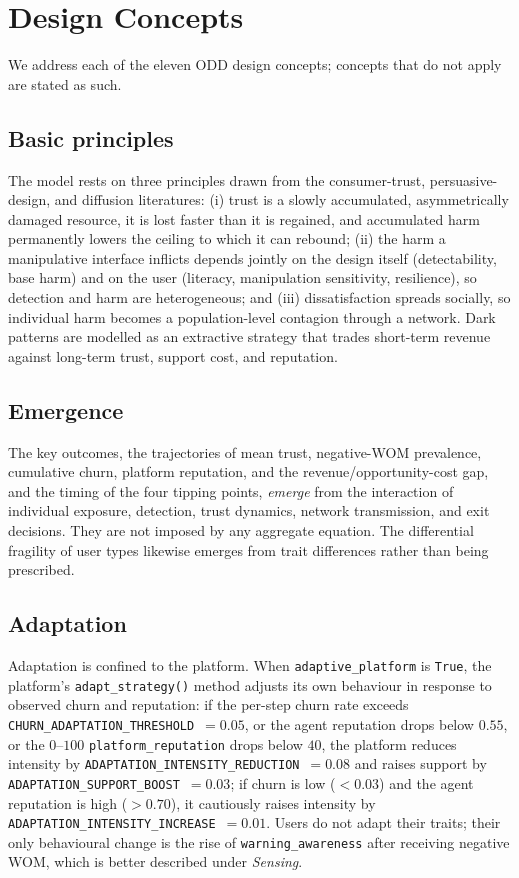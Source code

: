 \documentclass[11pt]{article}
\newcommand{\code}[1]{\texttt{#1}}
\begin{document}
\section{Design Concepts}
\label{sec:design}

We address each of the eleven ODD design concepts; concepts that do not apply are
stated as such.

\subsection{Basic principles}
The model rests on three principles drawn from the consumer-trust, persuasive-design,
and diffusion literatures: (i) trust is a slowly accumulated, asymmetrically
damaged resource, it is lost faster than it is regained, and accumulated harm
permanently lowers the ceiling to which it can rebound; (ii) the harm a
manipulative interface inflicts depends jointly on the design itself
(detectability, base harm) and on the user (literacy, manipulation sensitivity,
resilience), so detection and harm are heterogeneous; and (iii) dissatisfaction
spreads socially, so individual harm becomes a population-level contagion through
a network. Dark patterns are modelled as an extractive strategy that trades
short-term revenue against long-term trust, support cost, and reputation.

\subsection{Emergence}
The key outcomes, the trajectories of mean trust, negative-WOM prevalence,
cumulative churn, platform reputation, and the revenue/opportunity-cost gap, and
the timing of the four tipping points, \emph{emerge} from the interaction of
individual exposure, detection, trust dynamics, network transmission, and exit
decisions. They are not imposed by any aggregate equation. The differential
fragility of user types likewise emerges from trait differences rather than being
prescribed.

\subsection{Adaptation}
Adaptation is confined to the platform. When \code{adaptive\_platform} is
\code{True}, the platform's \code{adapt\_strategy()} method adjusts its own
behaviour in response to observed churn and reputation: if the per-step churn
rate exceeds \code{CHURN\_ADAPTATION\_THRESHOLD}~$=0.05$, or the agent reputation
drops below $0.55$, or the $0$--$100$ \code{platform\_reputation} drops below
$40$, the platform reduces intensity by
\code{ADAPTATION\_INTENSITY\_REDUCTION}~$=0.08$ and raises support by
\code{ADAPTATION\_SUPPORT\_BOOST}~$=0.03$; if churn is low ($<0.03$) and the
agent reputation is high ($>0.70$), it cautiously raises intensity by
\code{ADAPTATION\_INTENSITY\_INCREASE}~$=0.01$. Users do not adapt their traits;
their only behavioural change is the rise of \code{warning\_awareness} after
receiving negative WOM, which is better described under \emph{Sensing}.
\end{document}
